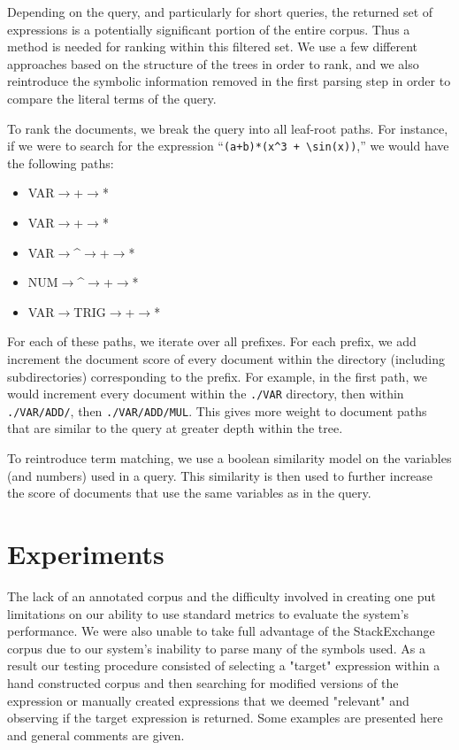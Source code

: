 \documentclass{sig-alternate}
\begin{document}
Depending on the query, and particularly for short queries, the returned set of expressions is a potentially
significant portion of the entire corpus. Thus a method is needed for ranking within this filtered set. We 
use a few different approaches based on the structure of the trees in order to rank, and we also reintroduce
the symbolic information removed in the first parsing step in order to compare the literal terms of the query.

To rank the documents, we break the query into all leaf-root paths.  For instance, if we were to search for the expression ``\texttt{(a+b)*(x\^{}3 + \textbackslash sin(x))},'' we would have the following paths:
\begin{itemize}
\item VAR$\rightarrow$+$\rightarrow$*
\item VAR$\rightarrow$+$\rightarrow$*
\item VAR$\rightarrow$\textasciicircum$\rightarrow$+$\rightarrow$*
\item NUM$\rightarrow$\textasciicircum$\rightarrow$+$\rightarrow$*
\item VAR$\rightarrow$TRIG$\rightarrow$+$\rightarrow$*
\end{itemize}

For each of these paths, we iterate over all prefixes.  For each prefix, we add increment the document score of every document within the directory (including subdirectories) corresponding to the prefix.  For example, in the first path, we would increment every document within the \texttt{./VAR} directory, then within \texttt{./VAR/ADD/}, then \texttt{./VAR/ADD/MUL}.  This gives more weight to document paths that are similar to the query at greater depth within the tree.

To reintroduce term matching, we use a boolean similarity  model on the variables (and numbers) used in a query.  This similarity is then used to further increase the score of documents that use the same variables as in the query.


\section{Experiments}
The lack of an annotated corpus and the difficulty involved in creating one put limitations on our ability
to use standard metrics to evaluate the system's performance. We were also unable to take full advantage of the 
StackExchange corpus due to our system's inability to parse many of the symbols used. As a result our testing procedure consisted of selecting a "target" expression within a hand constructed corpus and then searching for modified versions of the expression or manually created expressions that we deemed "relevant" and observing if the target expression is returned. Some examples are presented here and general comments are given. 
\end{document}
